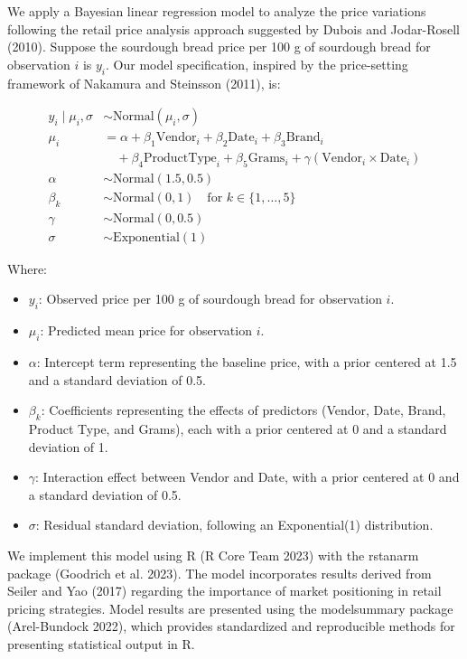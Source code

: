 \documentclass[
  letterpaper,
  DIV=11,
  numbers=noendperiod]{scrartcl}
\begin{document}
We apply a Bayesian linear regression model to analyze the price
variations following the retail price analysis approach suggested by
Dubois and Jodar-Rosell (2010). Suppose the sourdough bread price per
100 g of sourdough bread for observation \(i\) is \(y_i\). Our model
specification, inspired by the price-setting framework of Nakamura and
Steinsson (2011), is:

\begin{align}
y_i \mid \mu_i, \sigma &\sim \text{Normal}(\mu_i, \sigma) \\
\mu_i &= \alpha + \beta_1 \text{Vendor}_i + \beta_2 \text{Date}_i + \beta_3 \text{Brand}_i \\
     &\quad + \beta_4 \text{ProductType}_i + \beta_5 \text{Grams}_i + \gamma (\text{Vendor}_i \times \text{Date}_i) \\
\alpha &\sim \text{Normal}(1.5, 0.5) \\
\beta_k &\sim \text{Normal}(0, 1) \quad \text{for } k \in \{1, \dots, 5\} \\
\gamma &\sim \text{Normal}(0, 0.5) \\
\sigma &\sim \text{Exponential}(1)
\end{align}

Where:

\begin{itemize}
    \item \( y_i \): Observed price per 100 g of sourdough bread for observation \( i \).
    \item \( \mu_i \): Predicted mean price for observation \( i \).
    \item \( \alpha \): Intercept term representing the baseline price, with a prior centered at 1.5 and a standard deviation of 0.5.
    \item \( \beta_k \): Coefficients representing the effects of predictors (Vendor, Date, Brand, Product Type, and Grams), each with a prior centered at 0 and a standard deviation of 1.
    \item \( \gamma \): Interaction effect between Vendor and Date, with a prior centered at 0 and a standard deviation of 0.5.
    \item \( \sigma \): Residual standard deviation, following an Exponential(1) distribution.
\end{itemize}

We implement this model using R (R Core Team 2023) with the rstanarm
package (Goodrich et al. 2023). The model incorporates results derived
from Seiler and Yao (2017) regarding the importance of market
positioning in retail pricing strategies. Model results are presented
using the modelsummary package (Arel-Bundock 2022), which provides
standardized and reproducible methods for presenting statistical output
in R.
\end{document}

